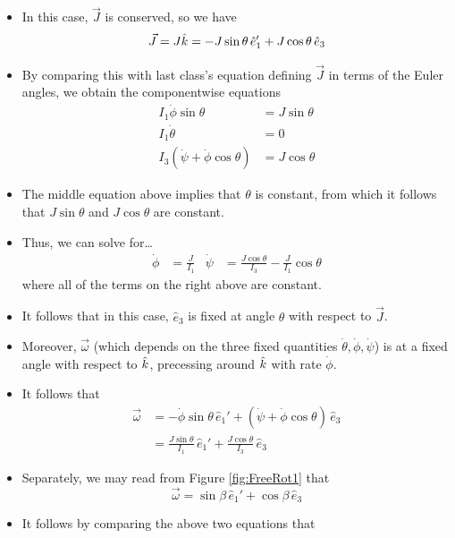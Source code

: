 \documentclass[../notes.tex]{subfiles}
\begin{document}
\begin{itemize}
\begin{itemize}
        \item In this case, $\vec{J}$ is conserved, so we have
        \begin{equation*}
            \vec{J} = J\hat{k}=-J\sin\theta\,\hat{e}_1'+J\cos\theta\,\hat{e}_3
        \end{equation*}
        \item By comparing this with last class's equation defining $\vec{J}$ in terms of the Euler angles, we obtain the componentwise equations
        \begin{align*}
            I_1\dot{\phi}\sin\theta &= J\sin\theta\\
            I_1\dot{\theta} &= 0\\
            I_3(\dot{\psi}+\dot{\phi}\cos\theta) &= J\cos\theta
        \end{align*}
        \item The middle equation above implies that $\theta$ is constant, from which it follows that $J\sin\theta$ and $J\cos\theta$ are constant.
        \item Thus, we can solve for\dots
        \begin{align*}
            \dot{\phi} &= \frac{J}{I_1}&
            \dot{\psi} &= \frac{J\cos\theta}{I_3}-\frac{J}{I_1}\cos\theta
        \end{align*}
        where all of the terms on the right above are constant.
        \item It follows that in this case, $\hat{e}_3$ is fixed at angle $\theta$ with respect to $\vec{J}$.
        \item Moreover, $\vec{\omega}$ (which depends on the three fixed quantities $\dot{\theta},\dot{\phi},\dot{\psi}$) is at a fixed angle with respect to $\hat{k}$, precessing around $\hat{k}$ with rate $\dot{\phi}$.
        \item It follows that
        \begin{align*}
            \vec{\omega} &= -\dot{\phi}\sin\theta\,\hat{e}_1'+(\dot{\psi}+\dot{\phi}\cos\theta)\,\hat{e}_3\\
            &= \frac{J\sin\theta}{I_1}\,\hat{e}_1'+\frac{J\cos\theta}{I_3}\,\hat{e}_3
        \end{align*}
        \item Separately, we may read from Figure \ref{fig:FreeRot1} that
        \begin{equation*}
            \vec{\omega} = \sin\beta\,\hat{e}_1'+\cos\beta\,\hat{e}_3
        \end{equation*}
        \item It follows by comparing the above two equations that

\end{itemize}
\end{itemize}
\end{document}
